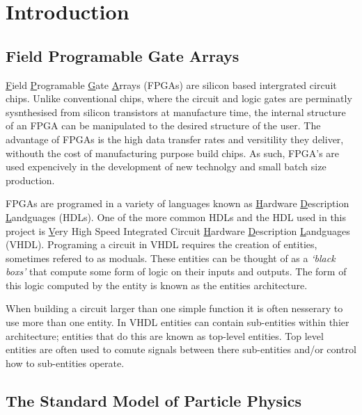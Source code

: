 \section{Introduction}

  \subsection{Field Programable Gate Arrays}

    \underline{F}ield \underline{P}rogramable \underline{G}ate \underline{A}rrays (FPGAs) are silicon based intergrated circuit chips.
    Unlike conventional chips, where the circuit and logic gates are perminatly sysnthesised from silicon transistors at manufacture time, the internal structure of an FPGA can be manipulated to the desired structure of the user.
    The advantage of FPGAs is the high data transfer rates and versitility they deliver, withouth the cost of manufacturing purpose build chips. 
    As such, FPGA's are used expencively in the development of new technolgy and small batch size production. \cite{fpga}
    \par
    FPGAs are programed in a variety of languages known as \underline{H}ardware \underline{D}escription \underline{L}andguages (HDLs).
    One of the more common HDLs and the HDL used in this project is \underline{V}ery High Speed Integrated Circuit \underline{H}ardware \underline{D}escription \underline{L}andguages (VHDL).
    Programing a circuit in VHDL requires the creation of entities, sometimes refered to as moduals.
    These entities can be thought of as a \textit{`black boxs'} that compute some form of logic on their inputs and outputs.
    The form of this logic computed by the entity is known as the entities architecture.
    \par
    When building a circuit larger than one simple function it is often nesserary to use more than one entity.
    In VHDL entities can contain sub-entities within thier architecture; entities that do this are known as top-level entities.
    Top level entities are often used to comute signals between there sub-entities and/or control how to sub-entities operate.

	\subsection{The Standard Model of Particle Physics}

